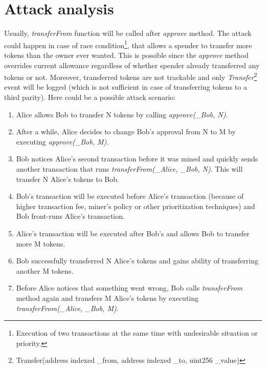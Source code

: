
\section{Attack analysis}
Usually, \textit{transferFrom} function will be called after \textit{approve} method. The attack could happen in case of race condition\footnote{Execution of two transactions at the same time with undesirable situation or priority.}, that allows a spender to transfer more tokens than the owner ever wanted. This is possible since the \textit{approve} method overrides current allowance regardless of whether spender already transferred any tokens or not. Moreover, transferred tokens are not trackable and only \textit{Transfer}\footnote{Transfer(address indexed \_from, address indexed \_to, uint256 \_value)} event will be logged (which is not sufficient in case of transferring tokens to a third parity). Here could be a possible attack scenario:
\begin{enumerate}
	\item Alice allows Bob to transfer N tokens by calling \textit{approve(\_Bob, N)}.
	\item After a while, Alice decides to change Bob's approval from N to M by executing \textit{approve(\_Bob, M)}.
	\item Bob notices Alice’s second transaction before it was mined and quickly sends another transaction that runs \textit{transferFrom(\_Alice, \_Bob, N)}. This will transfer N Alice’s tokens to Bob.
	\item Bob’s transaction will be executed before Alice’s transaction (because of higher transaction fee, miner’s policy or other prioritization techniques) and Bob front-runs Alice’s transaction.
	\item Alice’s transaction will be executed after Bob’s and allows Bob to transfer more M tokens.
	\item Bob successfully transferred N Alice’s tokens and gains ability of transferring another M tokens.
	\item Before Alice notices that something went wrong, Bob calls \textit{transferFrom} method again and transfers M Alice’s tokens by executing \textit{transferFrom(\_Alice, \_Bob, M)}.\newline
\end{enumerate}

